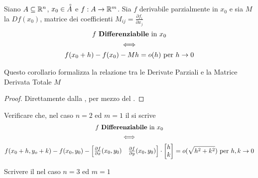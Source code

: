 \begin{corollary}
	\label{coro:f_diff_con_matr_comp}
	Siano $A \subseteq \mathbb{R}^n$, $x_0 \in \accentset{\circ}{A}$ e $f:A \to \mathbb{R}^m$. Sia $f$ derivabile parzialmente in $x_0$ e sia $M$ la $Df(x_0)$, matrice dei coefficienti $M_{ij} = \frac{\partial f_i}{\partial x_j}$
	\begin{equation*}
		\begin{gathered}
			f \text{ \textbf{Differenziabile} in } x_0\\
			\iff\\
			f(x_0 + h) - f(x_0) - Mh = o(h) \text{ per } h \to 0
		\end{gathered}
	\end{equation*}
	\begin{note}
		Questo corollario formalizza la relazione tra le Derivate Parziali e la Matrice Derivata Totale $M$
	\end{note}
	\begin{proof}
		Direttamente dalla , per mezzo del .
	\end{proof}
\end{corollary}
\begin{exercise}
	Verificare che, nel caso $n = 2$ ed $m = 1$ il  si scrive
	\begin{equation*}
		\begin{gathered}
			f \text{ \textbf{Differenziabile} in } x_0\\
			\iff\\
			f(x_0 + h, y_o + k) - f(x_0, y_0) -
			\begin{bmatrix}
				\frac{\partial f}{\partial x}(x_0, y_0) & \frac{\partial f}{\partial y}(x_0, y_0)
			\end{bmatrix}
			\cdot
			\begin{bmatrix}
				h\\
				k
			\end{bmatrix}
			= o(\sqrt{h^2 + k^2}) \text{ per } h, k \to 0
		\end{gathered}
	\end{equation*}
\end{exercise}
\begin{exercise}
	Scrivere il  nel caso $n = 3$ ed $m = 1$
\end{exercise}

